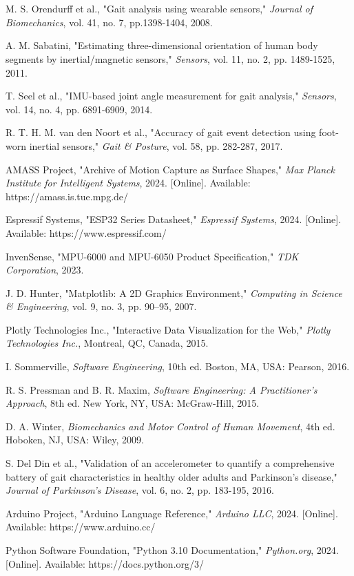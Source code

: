 \documentclass[12pt,a4paper]{report}
\makeatletter
\renewenvironment{thebibliography}[1]
  {\section*{}\@mkboth{}{}%
   \list{\@biblabel{\@arabic\c@enumiv}}%
        {\settowidth\labelwidth{\@biblabel{#1}}%
         \leftmargin\labelwidth
         \advance\leftmargin\labelsep
         \itemsep=0.6\baselineskip
         \usecounter{enumiv}%
         \let\p@enumiv\@empty
         \renewcommand\theenumiv{\@arabic\c@enumiv}}%
   \sloppy}
  {\endlist}
\makeatother
\begin{document}
\begin{thebibliography}{10}

M. S. Orendurff et al., "Gait analysis using wearable sensors," 
\textit{Journal of Biomechanics}, vol. 41, no. 7, pp.1398-1404, 2008.

A. M. Sabatini, "Estimating three-dimensional orientation of human body segments by inertial/magnetic sensors," 
\textit{Sensors}, vol. 11, no. 2, pp. 1489-1525, 2011.

T. Seel et al., "IMU-based joint angle measurement for gait analysis," 
\textit{Sensors}, vol. 14, no. 4, pp. 6891-6909, 2014.

R. T. H. M. van den Noort et al., "Accuracy of gait event detection using foot-worn inertial sensors," 
\textit{Gait \& Posture}, vol. 58, pp. 282-287, 2017.

AMASS Project, "Archive of Motion Capture as Surface Shapes," 
\textit{Max Planck Institute for Intelligent Systems}, 2024. [Online]. Available: https://amass.is.tue.mpg.de/

Espressif Systems, "ESP32 Series Datasheet," 
\textit{Espressif Systems}, 2024. [Online]. Available: https://www.espressif.com/

InvenSense, "MPU-6000 and MPU-6050 Product Specification," 
\textit{TDK Corporation}, 2023.

J. D. Hunter, "Matplotlib: A 2D Graphics Environment," 
\textit{Computing in Science \& Engineering}, vol. 9, no. 3, pp. 90–95, 2007.

Plotly Technologies Inc., "Interactive Data Visualization for the Web," 
\textit{Plotly Technologies Inc.}, Montreal, QC, Canada, 2015.

I. Sommerville, \textit{Software Engineering}, 10th ed. 
Boston, MA, USA: Pearson, 2016.

R. S. Pressman and B. R. Maxim, \textit{Software Engineering: A Practitioner's Approach}, 8th ed. 
New York, NY, USA: McGraw-Hill, 2015.

D. A. Winter, \textit{Biomechanics and Motor Control of Human Movement}, 4th ed. 
Hoboken, NJ, USA: Wiley, 2009.

S. Del Din et al., "Validation of an accelerometer to quantify a comprehensive battery of gait characteristics in healthy older adults and Parkinson's disease," 
\textit{Journal of Parkinson's Disease}, vol. 6, no. 2, pp. 183-195, 2016.

Arduino Project, "Arduino Language Reference," 
\textit{Arduino LLC}, 2024. [Online]. Available: https://www.arduino.cc/

Python Software Foundation, "Python 3.10 Documentation," 
\textit{Python.org}, 2024. [Online]. Available: https://docs.python.org/3/

\end{thebibliography}
\end{document}

